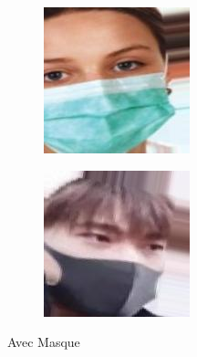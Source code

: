 \documentclass{cubeamer}
\begin{document}
\begin{frame}
\begin{minipage}{.49\textwidth}
\begin{figure}
	\begin{subfigure}{.45\textwidth}
		\centering
		\includegraphics[width=.8\linewidth]{img/am3.jpg}  
	\end{subfigure}
	\begin{subfigure}{.45\textwidth}
		\centering
		\includegraphics[width=.8\linewidth]{img/am4.jpg}  
	\end{subfigure}
	\caption{Avec Masque}
\end{figure}
\end{minipage}

\end{frame}
\end{document}
